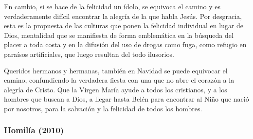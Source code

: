 \begin{body}
					En cambio, si se hace de la felicidad un ídolo, se equivoca el camino y es verdaderamente difícil encontrar la alegría de la que habla Jesús. Por desgracia, esta es la propuesta de las culturas que ponen la felicidad individual en lugar de Dios, mentalidad que se manifiesta de forma emblemática en la búsqueda del placer a toda costa y en la difusión del uso de drogas como fuga, como refugio en paraísos artificiales, que luego resultan del todo ilusorios.
					
					Queridos hermanos y hermanas, también en Navidad se puede equivocar el camino, confundiendo la verdadera fiesta con una que no abre el corazón a la alegría de Cristo. Que la Virgen María ayude a todos los cristianos, y a los hombres que buscan a Dios, a llegar hasta Belén para encontrar al Niño que nació por nosotros, para la salvación y la felicidad de todos los hombres.
				\end{body}


			\subsubsection{Homilía (2010)}
				

